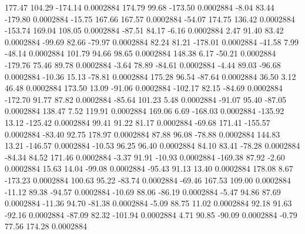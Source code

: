       177.47      104.29     -174.14     0.0002884
      174.79       99.68     -173.50     0.0002884
       -8.04       83.44     -179.80     0.0002884
      -15.75      167.66      167.57     0.0002884
      -54.07      174.75      136.42     0.0002884
     -153.74      169.04      108.05     0.0002884
      -87.51       84.17       -6.16     0.0002884
        2.47       91.40       83.42     0.0002884
      -99.69       82.66      -79.97     0.0002884
       82.24       81.21     -178.01     0.0002884
      -41.58        7.99      -48.14     0.0002884
      101.79       94.66       98.65     0.0002884
      148.38        6.17      -50.21     0.0002884
     -179.76       75.46       89.78     0.0002884
       -3.64       78.89      -84.61     0.0002884
       -4.44       89.03      -96.68     0.0002884
      -10.36       15.13      -78.81     0.0002884
      175.28       96.54      -87.64     0.0002884
       36.50        3.12       46.48     0.0002884
      173.50       13.09      -91.06     0.0002884
     -102.17       82.15      -84.69     0.0002884
     -172.70       91.77       87.82     0.0002884
      -85.64      101.23        5.48     0.0002884
      -91.07       95.40      -87.05     0.0002884
      138.47        7.52      119.91     0.0002884
      169.06        6.69     -168.03     0.0002884
     -135.92       13.12     -125.42     0.0002884
       99.41       91.22       81.17     0.0002884
      -69.68      171.41     -155.57     0.0002884
      -83.40       92.75      178.97     0.0002884
       87.88       96.08      -78.88     0.0002884
      144.83       13.21     -146.57     0.0002884
      -10.53       96.25       96.40     0.0002884
       84.10       83.41      -78.28     0.0002884
      -84.34       84.52      171.46     0.0002884
       -3.37       91.91      -10.93     0.0002884
     -169.38       87.92       -2.60     0.0002884
       15.63       14.04      -99.08     0.0002884
      -95.43       91.13       13.40     0.0002884
      178.08        8.67     -173.23     0.0002884
      100.63       95.22      -83.74     0.0002884
      -69.46      167.53      109.00     0.0002884
      -11.12       89.38      -94.57     0.0002884
      -10.69       88.06      -86.19     0.0002884
       -5.47       94.86       87.69     0.0002884
      -11.36       94.70      -81.38     0.0002884
       -5.09       88.75       11.02     0.0002884
       92.18       91.63      -92.16     0.0002884
      -87.09       82.32     -101.94     0.0002884
        4.71       90.85      -90.09     0.0002884
       -0.79       77.56      174.28     0.0002884
